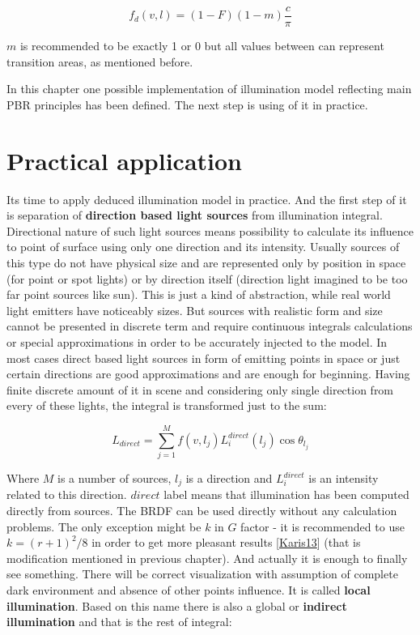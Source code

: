\[f_d(v,l) = (1-F)(1-m)\frac{c}{\pi}\]

$m$ is recommended to be exactly 1 or 0 but all values between can represent transition areas, as mentioned before.

In this chapter one possible implementation of illumination model reflecting main P\+BR principles has been defined. The next step is using of it in practice.\hypertarget{specification__pbr_math_pbr_practical_application}{}\section{Practical application}\label{specification__pbr_math_pbr_practical_application}
It\textquotesingle{}s time to apply deduced illumination model in practice. And the first step of it is separation of {\bfseries direction based light sources} from illumination integral. Directional nature of such light sources means possibility to calculate it\textquotesingle{}s influence to point of surface using only one direction and its intensity. Usually sources of this type do not have physical size and are represented only by position in space (for point or spot lights) or by direction itself (direction light imagined to be too far point sources like sun). This is just a kind of abstraction, while real world light emitters have noticeably sizes. But sources with realistic form and size cannot be presented in discrete term and require continuous integrals calculations or special approximations in order to be accurately injected to the model. In most cases direct based light sources in form of emitting points in space or just certain directions are good approximations and are enough for beginning. Having finite discrete amount of it in scene and considering only single direction from every of these lights, the integral is transformed just to the sum\+:

\[L_{direct} = \sum_{j=1}^M f(v, l_j) L_i^{direct}(l_j) \cos\theta_{l_j}\]

Where $M$ is a number of sources, $l_j$ is a direction and $L_i^{direct}$ is an intensity related to this direction. $direct$ label means that illumination has been computed directly from sources. The B\+R\+DF can be used directly without any calculation problems. The only exception might be $k$ in $G$ factor -\/ it is recommended to use $ k = (r+1)^2 / 8 $ in order to get more pleasant results \mbox{[}\hyperlink{specification__pbr_math_Karis13}{Karis13}\mbox{]} (that is modification mentioned in previous chapter). And actually it is enough to finally see something. There will be correct visualization with assumption of complete dark environment and absence of other points influence. It is called {\bfseries local illumination}. Based on this name there is also a global or {\bfseries indirect illumination} and that is the rest of integral\+:


